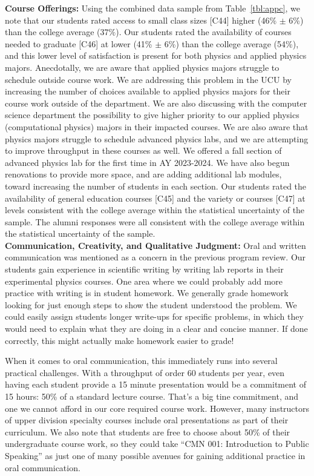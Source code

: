 \documentclass[12pt]{article}
\begin{document}
\noindent
{\bf Course Offerings:} Using the combined data sample from
Table~\ref{tbl:appc}, we note that our students rated access to small
class sizes [C44] higher (46\% $\pm$ 6\%) than the college average
($37\%$).  Our students rated the availability of courses needed to
graduate [C46] at lower (41\% $\pm$ 6\%) than the college average
(54\%), and this lower level of satisfaction is present for both
physics and applied physics majors.  Anecdotally, we are aware that
applied physics majors struggle to schedule outside course work.  We
are addressing this problem in the UCU by increasing the number of
choices available to applied physics majors for their course work
outside of the department.  We are also discussing with the computer
science department the possibility to give higher priority to our
applied physics (computational physics) majors in their impacted
courses.  We are also aware that physics majors struggle to schedule
advanced physics labs, and we are attempting to improve throughput in
these courses as well.  We offered a fall section of advanced physics
lab for the first time in AY 2023-2024.  We have also begun
renovations to provide more space, and are adding additional lab
modules, toward increasing the number of students in each section.
Our students rated the availability of general education courses [C45]
and the variety or courses [C47] at levels consistent with the college
average within the statistical uncertainty of the sample.  The alumni
responses were all consistent with the college average within the
statistical uncertainty of the sample.\\[3pt]

\noindent
{\bf Communication, Creativity, and Qualitative Judgment:} Oral and
written communication was mentioned as a concern in the previous
program review.  Our students gain experience in scientific writing by
writing lab reports in their experimental physics courses.  One area
where we could probably add more practice with writing is in student
homework.  We generally grade homework looking for just enough steps
to show the student understood the problem.  We could easily assign
students longer write-ups for specific problems, in which they would
need to explain what they are doing in a clear and concise manner.  If
done correctly, this might actually make homework easier to grade!

When it comes to oral communication, this immediately runs into
several practical challenges.  With a throughput of order 60 students
per year, even having each student provide a 15 minute presentation
would be a commitment of 15 hours: 50\% of a standard lecture course.
That's a big tine commitment, and one we cannot afford in our core
required course work.  However, many instructors of upper division
specialty courses include oral presentations as part of their
curriculum.  We also note that students are free to choose about 50\%
of their undergraduate course work, so they could take ``CMN 001:
Introduction to Public Speaking'' as just one of many possible avenues
for gaining additional practice in oral communication.
\end{document}

